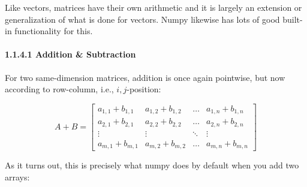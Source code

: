\documentclass[11pt]{article}
\begin{document}
Like vectors, matrices have their own arithmetic and it is largely an
extension or generalization of what is done for vectors. Numpy likewise
has lots of good built-in functionality for this.

\hypertarget{addition-subtraction}{%
\paragraph{1.1.4.1 Addition \& Subtraction}\label{addition-subtraction}}

For two same-dimension matrices, addition is once again pointwise, but
now according to row-column, i.e., \(i,j\)-position:

\[ A + B = \begin{bmatrix} a_{1,1} + b_{1,1} & a_{1,2} + b_{1,2} & \dots & a_{1,n} + b_{1,n} \\ a_{2,1} + b_{2,1} & a_{2,2} + b_{2,2} & \dots & a_{2,n} + b_{2,n} \\ \vdots & \vdots & \ddots & \vdots \\ a_{m,1} + b_{m,1} & a_{m,2} + b_{m,2} & \dots & a_{m,n} + b_{m,n} \end{bmatrix} \]

As it turns out, this is precisely what numpy does by default when you
add two arrays:
\end{document}
